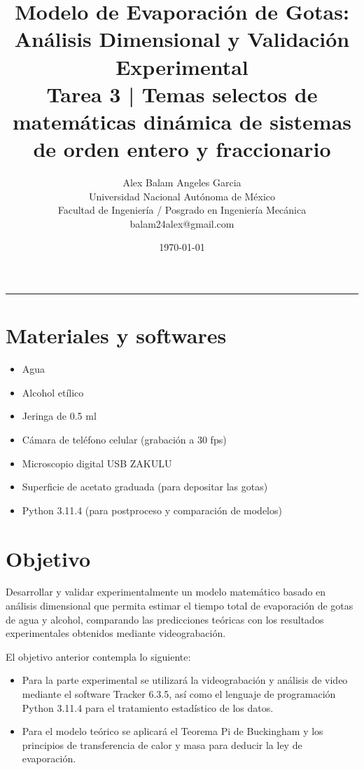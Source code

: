 \documentclass[12pt, letterpaper, onecolumn]{article}
\title{\textbf{Modelo de Evaporación de Gotas: Análisis Dimensional y Validación Experimental}\\
  \large Tarea 3 | Temas selectos de matemáticas dinámica de sistemas de orden entero y fraccionario}
\author{%
  Alex Balam Angeles Garcia\\
  \small Universidad Nacional Autónoma de México \\
  \small Facultad de Ingeniería / Posgrado en Ingeniería Mecánica\\
  \small balam24alex@gmail.com}
\date{\today}
\begin{document}
\maketitle
\begin{center}
  \rule{\linewidth}{0.8pt}
\end{center}

\newpage

\section{Materiales y softwares}\label{sec:materiales}

\begin{itemize}
  \item Agua 
  \item Alcohol etílico 
  \item Jeringa de 0.5 ml
  \item Cámara de teléfono celular (grabación a 30 fps)
  \item Microscopio digital USB ZAKULU
  \item Superficie de acetato graduada (para depositar las gotas)
  \item Python 3.11.4 (para postproceso y comparación de modelos)
\end{itemize}

\section{Objetivo}\label{sec:objetivo}

Desarrollar y validar experimentalmente un modelo matemático basado en análisis dimensional que permita estimar el tiempo total de evaporación de gotas de agua y alcohol, comparando las predicciones teóricas con los resultados experimentales obtenidos mediante videograbación.

El objetivo anterior contempla lo siguiente:
\begin{itemize}
  \item Para la parte experimental se utilizará la videograbación y análisis de video mediante el software Tracker 6.3.5, así como el lenguaje de programación Python 3.11.4 para el tratamiento estadístico de los datos.
  \item Para el modelo teórico se aplicará el Teorema Pi de Buckingham \citep{szirtes2007, cengel2010} y los principios de transferencia de calor y masa para deducir la ley de evaporación.
\end{itemize}
\end{document}
